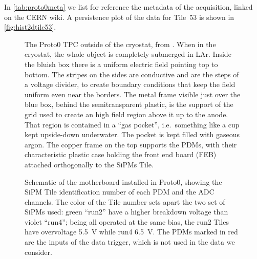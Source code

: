 In \autoref{tab:proto0meta} we list for reference the metadata of the
acquisition, linked on the CERN wiki. A persistence plot of the data for
Tile~53 is shown in \autoref{fig:hist2dtile53}.

\begin{figure}
    
    
    \caption{\label{fig:proto0} The Proto0 TPC outside of the cryostat, from
    \cite[50]{luzzi2020}. When in the cryostat, the whole object is completely
    submerged in LAr. Inside the bluish box there is a uniform electric field
    pointing top to bottom. The stripes on the sides are conductive and are the
    steps of a voltage divider, to create boundary conditions that keep the
    field uniform even near the borders. The metal frame visible just over the
    blue box, behind the semitransparent plastic, is the support of the grid
    used to create an high field region above it up to the anode. That region
    is contained in a ``gas pocket'', i.e.\ something like a cup kept
    upside-down underwater. The pocket is kept filled with gaseous argon. The
    copper frame on the top supports the PDMs, with their characteristic
    plastic case holding the front end board (FEB) attached orthogonally to the
    SiPMs Tile.}
    
\end{figure}

\begin{figure}
    
    
    \caption{\label{fig:pdmadcch} Schematic of the motherboard installed in
    Proto0, showing the SiPM Tile identification number of each PDM and the ADC
    channels. The color of the Tile number sets apart the two set of SiPMs
    used: green ``run2'' have a higher breakdown voltage than violet ``run4'';
    being all operated at the same bias, the run2 Tiles have overvoltage
    \SI{5.5}{V} while run4 \SI{6.5}{V}. The PDMs marked in red are the inputs
    of the data trigger, which is not used in the data we consider.}

\end{figure}


